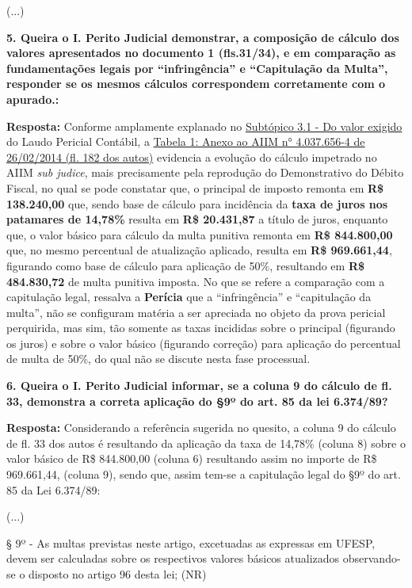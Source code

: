 (...)

\textbf{5.	Queira o I. Perito Judicial demonstrar, a composição de cálculo dos valores apresentados no documento 1 (fls.31/34), e em comparação as fundamentações legais por “infringência” e “Capitulação da Multa”, responder se os mesmos cálculos correspondem corretamente com o apurado.:}

\textbf{Resposta:}	Conforme amplamente explanado no \hyperlink{3.1}{Subtópico 3.1 - Do valor exigido} do Laudo Pericial Contábil, a \hyperlink{tab1}{Tabela 1: Anexo ao AIIM n° 4.037.656-4 de 26/02/2014 (fl. 182 dos autos)} evidencia a evolução do cálculo impetrado no AIIM \textit{sub judice}, mais precisamente pela reprodução do Demonstrativo do Débito Fiscal, no qual se pode constatar que, o principal de imposto remonta em \textbf{R\$ 138.240,00} que, sendo base de cálculo para incidência da \textbf{taxa de juros nos patamares de 14,78\%} resulta em \textbf{R\$ 20.431,87} a título de juros, enquanto que, o valor básico para cálculo da multa punitiva remonta em \textbf{R\$ 844.800,00} que, no mesmo percentual de atualização aplicado, resulta em \textbf{R\$ 969.661,44}, figurando como base de cálculo para aplicação de 50\%, resultando em \textbf{R\$ 484.830,72} de multa punitiva imposta.
No que se refere a comparação com a capitulação legal, ressalva a \textbf{Perícia} que a “infringência” e “capitulação da multa”, não se configuram matéria a ser apreciada no objeto da prova pericial perquirida, mas sim, tão somente as taxas incididas sobre o principal (figurando os juros) e sobre o valor básico (figurando correção) para aplicação do percentual de multa de 50\%, do qual não se discute nesta fase processual.

\textbf{6.	Queira o I. Perito Judicial informar, se a coluna 9 do cálculo de fl. 33, demonstra a correta aplicação do §9º do art. 85 da lei 6.374/89?}

\textbf{Resposta:}	Considerando a referência sugerida no quesito, a coluna 9 do cálculo de fl. 33 dos autos é resultando da aplicação da taxa de 14,78\% (coluna 8) sobre o valor básico de R\$ 844.800,00 (coluna 6) resultando assim no importe de R\$ 969.661,44, (coluna 9), sendo que, assim tem-se a capitulação legal do §9º do art. 85 da Lei 6.374/89:

(...)

§ 9º - As multas previstas neste artigo, excetuadas as expressas em UFESP, devem ser calculadas sobre os respectivos valores básicos atualizados observando-se o disposto no artigo 96 desta lei; (NR)

